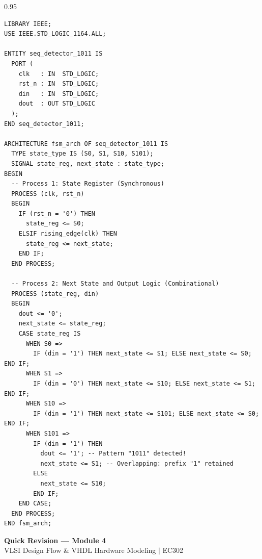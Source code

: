 \documentclass[12pt,a4paper]{article}
\begin{document}
\begin{tcolorbox}[examplebox, title={4. FSM Sequence Detector for Pattern "1011" (Overlapping Mealy Machine)}]
\begin{spacing}{0.95}
\begin{verbatim}
LIBRARY IEEE;
USE IEEE.STD_LOGIC_1164.ALL;

ENTITY seq_detector_1011 IS
  PORT (
    clk   : IN  STD_LOGIC;
    rst_n : IN  STD_LOGIC;
    din   : IN  STD_LOGIC;
    dout  : OUT STD_LOGIC
  );
END seq_detector_1011;

ARCHITECTURE fsm_arch OF seq_detector_1011 IS
  TYPE state_type IS (S0, S1, S10, S101);
  SIGNAL state_reg, next_state : state_type;
BEGIN
  -- Process 1: State Register (Synchronous)
  PROCESS (clk, rst_n)
  BEGIN
    IF (rst_n = '0') THEN
      state_reg <= S0;
    ELSIF rising_edge(clk) THEN
      state_reg <= next_state;
    END IF;
  END PROCESS;

  -- Process 2: Next State and Output Logic (Combinational)
  PROCESS (state_reg, din)
  BEGIN
    dout <= '0';
    next_state <= state_reg;
    CASE state_reg IS
      WHEN S0 =>
        IF (din = '1') THEN next_state <= S1; ELSE next_state <= S0; END IF;
      WHEN S1 =>
        IF (din = '0') THEN next_state <= S10; ELSE next_state <= S1; END IF;
      WHEN S10 =>
        IF (din = '1') THEN next_state <= S101; ELSE next_state <= S0; END IF;
      WHEN S101 =>
        IF (din = '1') THEN
          dout <= '1'; -- Pattern "1011" detected!
          next_state <= S1; -- Overlapping: prefix "1" retained
        ELSE
          next_state <= S10;
        END IF;
    END CASE;
  END PROCESS;
END fsm_arch;
\end{verbatim}
\end{spacing}
\end{tcolorbox}

\newpage
\begin{center}
  {\large\bfseries\color{myred} Quick Revision --- Module 4}\\[3pt]
  {\small\color{mydark} VLSI Design Flow \& VHDL Hardware Modeling $|$ EC302}
\end{center}
\noindent{\color{myred}\rule{\linewidth}{1.2pt}}
\vspace{4pt}
\end{document}
